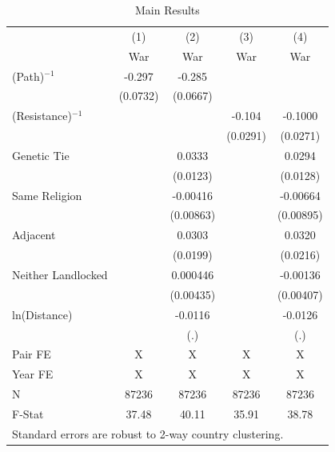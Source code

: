\documentclass{article}
\begin{document}
\begin{table}[htbp]\centering
\caption{Main Results \label{tab:Main}}
\begin{tabular}{l*{4}{c}}
\toprule
                    &\multicolumn{1}{c}{(1)}&\multicolumn{1}{c}{(2)}&\multicolumn{1}{c}{(3)}&\multicolumn{1}{c}{(4)}\\
                    &\multicolumn{1}{c}{War}&\multicolumn{1}{c}{War}&\multicolumn{1}{c}{War}&\multicolumn{1}{c}{War}\\
\midrule
(Path)$^{-1}$       &      -0.297&      -0.285&            &            \\
                    &    (0.0732)&    (0.0667)&            &            \\
\addlinespace
(Resistance)$^{-1}$ &            &            &      -0.104&     -0.1000\\
                    &            &            &    (0.0291)&    (0.0271)\\
\addlinespace
Genetic Tie         &            &      0.0333&            &      0.0294\\
                    &            &    (0.0123)&            &    (0.0128)\\
\addlinespace
Same Religion       &            &    -0.00416&            &    -0.00664\\
                    &            &   (0.00863)&            &   (0.00895)\\
\addlinespace
Adjacent            &            &      0.0303&            &      0.0320\\
                    &            &    (0.0199)&            &    (0.0216)\\
\addlinespace
Neither Landlocked  &            &    0.000446&            &    -0.00136\\
                    &            &   (0.00435)&            &   (0.00407)\\
\addlinespace
ln(Distance)        &            &     -0.0116&            &     -0.0126\\
                    &            &         (.)&            &         (.)\\
\midrule
Pair FE             &           X&           X&           X&           X\\
Year FE             &           X&           X&           X&           X\\
N                   &       87236&       87236&       87236&       87236\\
F-Stat              &       37.48&       40.11&       35.91&       38.78\\
\bottomrule
\multicolumn{5}{l}{\footnotesize Standard errors are robust to 2-way country clustering.}\\
\end{tabular}
\end{table}
\end{document}
